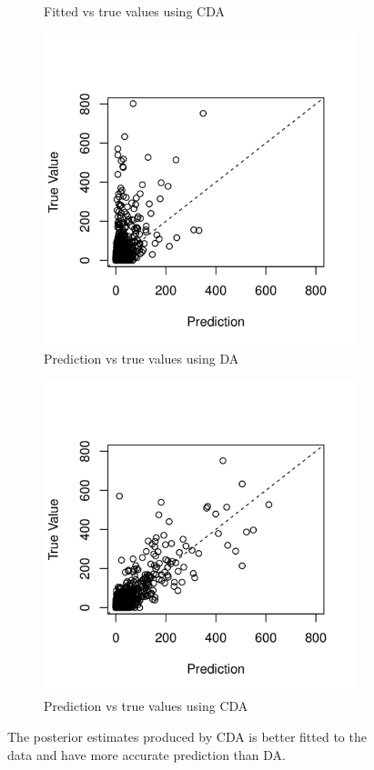 \documentclass[10pt]{article}
\begin{document}
\begin{figure}[H]
\begin{subfigure}[b]{0.45\textwidth}
 \caption{Fitted vs true values using CDA}
 \end{subfigure}  
   \begin{subfigure}[b]{0.45\textwidth}
 \includegraphics[width=1\textwidth]{poisson_cv_da.png}
 \caption{Prediction vs true values using DA}
 \end{subfigure}
  \hfill 
 \begin{subfigure}[b]{0.45\textwidth}
 \includegraphics[width=1\textwidth]{poisson_cv_ada.png}
 \caption{Prediction vs true values using CDA}
 \end{subfigure} 
 \caption{The posterior estimates produced by CDA is better fitted to the data and have more accurate prediction than DA.}
 \end{figure}
\end{document}
